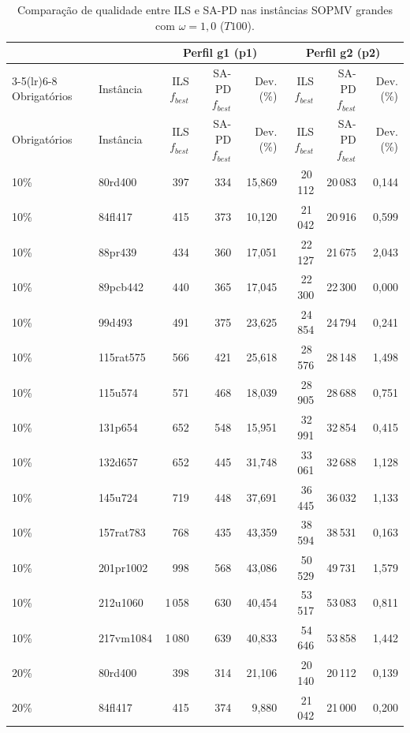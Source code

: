 \begin{longtable}{llrrr|rrr}
\caption{Comparação de qualidade entre ILS e SA-PD nas instâncias SOPMV grandes com $\omega=1{,}0$ ($T100$).} \label{tab:ils-sapd-sopmv-large}\\
\toprule
& & \multicolumn{3}{c}{Perfil g1 (p1)} & \multicolumn{3}{c}{Perfil g2 (p2)} \\
\cmidrule(lr){3-5}\cmidrule(lr){6-8}
Obrigatórios & Instância & ILS $f_{best}$ & SA-PD $f_{best}$ & Dev. (\%) & ILS $f_{best}$ & SA-PD $f_{best}$ & Dev. (\%) \\
\midrule
\endfirsthead
\toprule
Obrigatórios & Instância & ILS $f_{best}$ & SA-PD $f_{best}$ & Dev. (\%) & ILS $f_{best}$ & SA-PD $f_{best}$ & Dev. (\%) \\
\midrule
\endhead
10\% & 80rd400 & 397 & 334 & 15{,}869 & 20\,112 & 20\,083 & 0{,}144 \\
10\% & 84fl417 & 415 & 373 & 10{,}120 & 21\,042 & 20\,916 & 0{,}599 \\
10\% & 88pr439 & 434 & 360 & 17{,}051 & 22\,127 & 21\,675 & 2{,}043 \\
10\% & 89pcb442 & 440 & 365 & 17{,}045 & 22\,300 & 22\,300 & 0{,}000 \\
10\% & 99d493 & 491 & 375 & 23{,}625 & 24\,854 & 24\,794 & 0{,}241 \\
10\% & 115rat575 & 566 & 421 & 25{,}618 & 28\,576 & 28\,148 & 1{,}498 \\
10\% & 115u574 & 571 & 468 & 18{,}039 & 28\,905 & 28\,688 & 0{,}751 \\
10\% & 131p654 & 652 & 548 & 15{,}951 & 32\,991 & 32\,854 & 0{,}415 \\
10\% & 132d657 & 652 & 445 & 31{,}748 & 33\,061 & 32\,688 & 1{,}128 \\
10\% & 145u724 & 719 & 448 & 37{,}691 & 36\,445 & 36\,032 & 1{,}133 \\
10\% & 157rat783 & 768 & 435 & 43{,}359 & 38\,594 & 38\,531 & 0{,}163 \\
10\% & 201pr1002 & 998 & 568 & 43{,}086 & 50\,529 & 49\,731 & 1{,}579 \\
10\% & 212u1060 & 1\,058 & 630 & 40{,}454 & 53\,517 & 53\,083 & 0{,}811 \\
10\% & 217vm1084 & 1\,080 & 639 & 40{,}833 & 54\,646 & 53\,858 & 1{,}442 \\
\midrule
20\% & 80rd400 & 398 & 314 & 21{,}106 & 20\,140 & 20\,112 & 0{,}139 \\
20\% & 84fl417 & 415 & 374 & 9{,}880 & 21\,042 & 21\,000 & 0{,}200 \\

\end{longtable}
